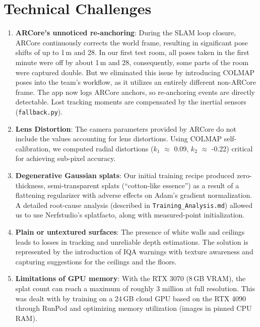 \section{Technical Challenges}
\begin{enumerate}
    \item \textbf{ARCore's unnoticed re-anchoring}: During the SLAM loop closure, ARCore continuously corrects the world frame, resulting in significant pose shifts of up to 1\,m and 28\textdegree{}. In our first test room, all poses taken in the first minute were off by about 1\,m and 28\textdegree{}, consequently, some parts of the room were captured double. But we eliminated this issue by introducing COLMAP poses into the team's workflow, as it utilizes an entirely different non-ARCore frame. The app now logs ARCore anchors, so re-anchoring events are directly detectable. Lost tracking moments are compensated by the inertial sensors (\texttt{fallback.py}).

    \item \textbf{Lens Distortion}: The camera parameters provided by ARCore do not include the values accounting for lens distortions. Using COLMAP self-calibration, we computed radial distortions ($k_1$ $\approx$ 0.09, $k_2$ $\approx$ -0.22) critical for achieving sub-pixel accuracy.

    \item \textbf{Degenerative Gaussian splats}: Our initial training recipe produced zero-thickness, semi-transparent splats (``cotton-like essence'') as a result of a flattening regularizer with adverse effects on Adam's gradient normalization. A detailed root-cause analysis (described in \texttt{Training\_Analysis.md}) allowed us to use Nerfstudio's splatfacto, along with measured-point initialization.

    \item \textbf{Plain or untextured surfaces}: The presence of white walls and ceilings leads to losses in tracking and unreliable depth estimations. The solution is represented by the introduction of IQA warnings with texture awareness and capturing suggestions for the ceilings and the floors.

    \item \textbf{Limitations of GPU memory}: With the RTX 3070 (8\,GB VRAM), the splat count can reach a maximum of roughly 3 million at full resolution. This was dealt with by training on a 24\,GB cloud GPU based on the RTX 4090 through RunPod and optimizing memory utilization (images in pinned CPU RAM).
\end{enumerate}

